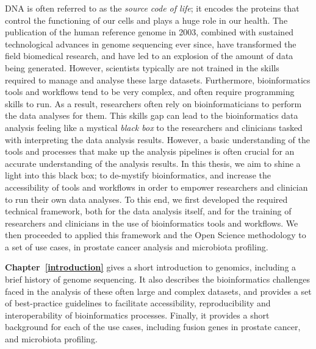 DNA is often referred to as the \emph{source code of life}; it encodes the proteins that control the functioning of our cells and plays a huge role in our health. The publication of the human reference genome in 2003, combined with sustained technological advances in genome sequencing ever since, have transformed the field biomedical research, and have led to an explosion of the amount of data being generated.
However, scientists typically are not trained in the skills required to manage and analyse these large datasets. Furthermore, bioinformatics tools and workflows tend to be very complex, and often require programming skills to run. As a result, researchers often rely on bioinformaticians to perform the data analyses for them.
This skills gap can lead to the bioinformatics data analysis feeling like a mystical \textit{black box} to the researchers and clinicians tasked with interpreting the data analysis results.
However, a basic understanding of the tools and processes that make up the analysis pipelines is often crucial for an accurate understanding of the analysis results. In this thesis, we aim to shine a light into this black box; to de-mystify bioinformatics, and increase the accessibility of tools and workflows in order to empower researchers and clinician to run their own data analyses.
To this end, we first developed the required technical framework, both for the data analysis itself, and for the training of researchers and clinicians in the use of bioinformatics tools and workflows. We then proceeded to applied this framework and the Open Science methodology to a set of use cases, in prostate cancer analysis and microbiota profiling.

\textbf{Chapter~\ref{introduction}} gives a short introduction to genomics, including a brief history of genome sequencing. It also describes the bioinformatics challenges faced in the analysis of these often large and complex datasets, and provides a set of best-practice guidelines to facilitate accessibility, reproducibility and interoperability of bioinformatics processes. Finally, it provides a short background for each of the use cases, including fusion genes in prostate cancer, and microbiota profiling.

